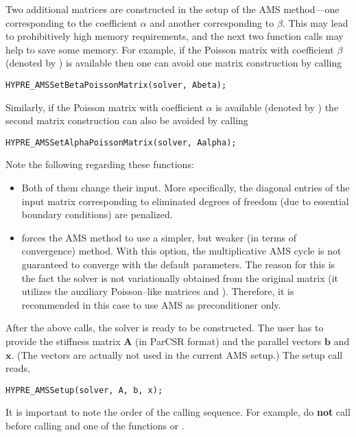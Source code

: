 Two additional matrices are constructed in the setup of the
AMS method---one corresponding to the coefficient $\alpha$
and another corresponding to $\beta$.
This may  lead to prohibitively high memory requirements, and
the next two function calls may help to save some memory.
For example, if the Poisson matrix with coefficient $\beta$
(denoted by ) is
available then one can avoid one matrix construction by calling
\begin{display}\begin{verbatim}
HYPRE_AMSSetBetaPoissonMatrix(solver, Abeta);
\end{verbatim}\end{display}
Similarly, if the Poisson matrix with coefficient $\alpha$ is available
(denoted by )
the second matrix construction can also be avoided by calling
\begin{display}\begin{verbatim}
HYPRE_AMSSetAlphaPoissonMatrix(solver, Aalpha);
\end{verbatim}\end{display}
Note the following regarding these functions:
\begin{itemize}
\item Both of them change their input. More specifically,
the diagonal entries of the input matrix corresponding to eliminated
degrees of freedom (due to essential boundary conditions)
are penalized.
\item {} forces the
AMS method to use a simpler, but weaker (in terms of convergence) method.
With this option, the multiplicative AMS cycle
is not guaranteed to converge with the
default parameters. The reason for this is the fact the solver is not
variationally obtained from the original matrix (it utilizes
the auxiliary Poisson--like matrices  and ).
Therefore, it is recommended in this case to use AMS as preconditioner
only.
\end{itemize}

After the above calls, the solver is ready to be constructed.
The user has to provide the stiffness matrix ${\mathbf A}$ (in ParCSR format) and
the \hypre{} parallel vectors ${\mathbf b}$ and ${\mathbf x}$. (The vectors
are actually not used in the current AMS setup.) The setup call reads,
\begin{display}\begin{verbatim}
HYPRE_AMSSetup(solver, A, b, x);
\end{verbatim}\end{display}
It is important to note the order of the calling sequence. For example, do {\bf not}
call  before calling
and one of the functions
 or .

